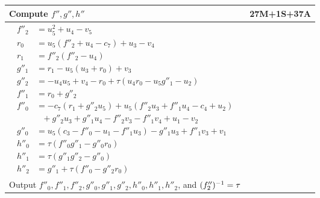 \pagebreak
\begin{tabularx}{\linewidth}{|Xr|}
  \hline
    Compute $f'', g'', h''$ & 27M+1S+37A \\
  \hline
  {\begin{align*}
    f''_2 &= u_5^2 + u_4 - v_5 \\
    r_0   &= u_5(f''_2 + u_4 - c_7) + u_3 - v_4 \\
    r_1   &= f''_2(f''_2 - u_4) \\
    g''_1 &= r_1 - u_5(u_3 + r_0) + v_3 \\
    g''_2 &= -u_4u_5 + v_4 - r_0 + \tau(u_4r_0 - u_5g''_1 - u_2) \\
    f''_1 &= r_0 + g''_2 \\
    f''_0 &= -c_7(r_1 + g''_2u_5) + u_5(f''_2u_3 + f''_1u_4 - c_4 + u_2) \\
          &~~~ + g''_2u_3 + g''_1u_4 - f''_2v_3 - f''_1v_4 + u_1 - v_2 \\
    g''_0 &= u_5(c_3 - f''_0 - u_1 - f''_1u_3) - g''_1u_3 + f''_1v_3 + v_1 \\
    h''_0 &= \tau(f''_0g''_1 - g''_0r_0) \\
    h''_1 &= \tau(g''_1g''_2 - g''_0) \\
    h''_2 &= g''_1 + \tau(f''_0 - g''_2r_0)
  \end{align*}} & \\
  \hline
    Output $f''_0, f''_1, f''_2, g''_0, g''_1, g''_2, h''_0, h''_1, h''_2$, and $(f''_2)^{-1} = \tau$ & \\
  \hline
\end{tabularx}

